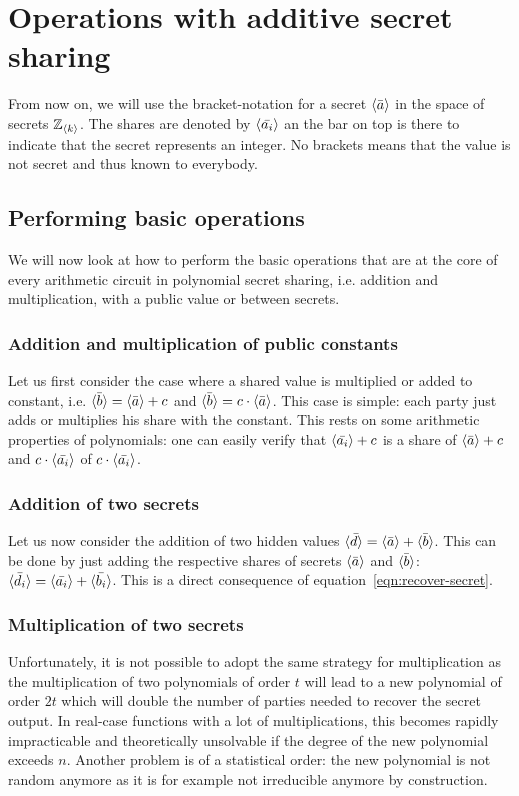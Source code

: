 \section{Operations with additive secret sharing}
From now on, we will use the bracket-notation for a secret $\langle \bar{a} \rangle$ in the space of secrets $\mathbb{Z}_{\langle k \rangle}$. The shares are denoted by $\langle \bar{a_i} \rangle$ an the bar on top is there to indicate that the secret represents an integer. No brackets means that the value is not secret and thus known to everybody.

\subsection{Performing basic operations}
We will now look at how to perform the basic operations that are at the core of every arithmetic circuit in polynomial secret sharing, i.e. addition and multiplication, with a public value or between secrets.

\subsubsection{Addition and multiplication of public constants}
Let us first consider the case where a shared value is multiplied or added to constant, i.e. $\langle \bar{b} \rangle = \langle \bar{a} \rangle + c$ and $\langle \bar{b} \rangle = c \cdot \langle \bar{a} \rangle$. This case is simple: each party just adds or multiplies his share with the constant. This rests on some arithmetic properties of polynomials: one can easily verify that $\langle \bar{a_i} \rangle+c$ is a share of $\langle \bar{a} \rangle+c$ and $c \cdot \langle \bar{a_i} \rangle$ of $c \cdot \langle \bar{a_i} \rangle$.

\subsubsection{Addition of two secrets}
Let us now consider the addition of two hidden values $\langle \bar{d} \rangle = \langle \bar{a} \rangle + \langle \bar{b} \rangle$. This can be done by just adding the respective shares of secrets $\langle \bar{a} \rangle$ and $\langle \bar{b} \rangle$: $\langle \bar{d_i} \rangle = \langle \bar{a_i} \rangle+\langle \bar{b_i} \rangle$. This is a direct consequence of equation~\ref{eqn:recover-secret}.


\subsubsection{Multiplication of two secrets}
Unfortunately, it is not possible to adopt the same strategy for multiplication as the multiplication of two polynomials of order $t$ will lead to a new polynomial of order $2t$ which will double the number of parties needed to recover the secret output. In real-case functions with a lot of multiplications, this becomes rapidly impracticable and theoretically unsolvable if the degree of the new polynomial exceeds $n$. Another problem is of a statistical order: the new polynomial is not random anymore as it is for example not irreducible anymore by construction.

